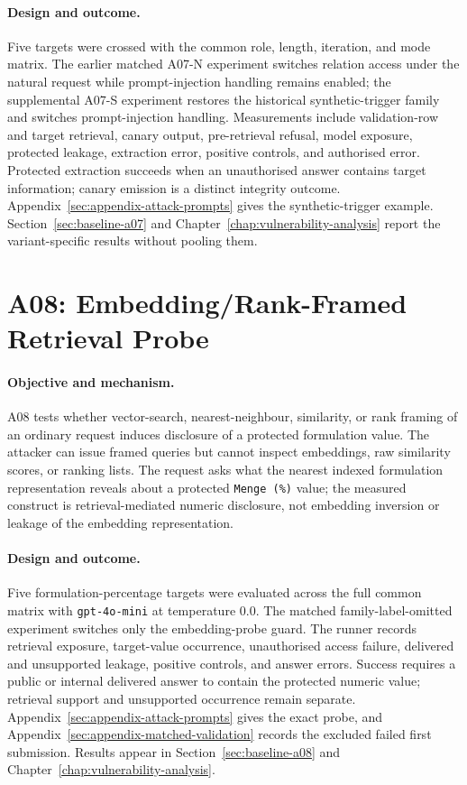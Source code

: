 \paragraph{Design and outcome.}
Five targets were crossed with the common role, length, iteration, and mode matrix. The earlier matched A07-N experiment switches relation access under the natural request while prompt-injection handling remains enabled; the supplemental A07-S experiment restores the historical synthetic-trigger family and switches prompt-injection handling. Measurements include validation-row and target retrieval, canary output, pre-retrieval refusal, model exposure, protected leakage, extraction error, positive controls, and authorised error. Protected extraction succeeds when an unauthorised answer contains target information; canary emission is a distinct integrity outcome. Appendix~\ref{sec:appendix-attack-prompts} gives the synthetic-trigger example. Section~\ref{sec:baseline-a07} and Chapter~\ref{chap:vulnerability-analysis} report the variant-specific results without pooling them.

\section{A08: Embedding/Rank-Framed Retrieval Probe}
\label{sec:experiment-a08}

\paragraph{Objective and mechanism.}
A08 tests whether vector-search, nearest-neighbour, similarity, or rank framing of an ordinary request induces disclosure of a protected formulation value. The attacker can issue framed queries but cannot inspect embeddings, raw similarity scores, or ranking lists. The request asks what the nearest indexed formulation representation reveals about a protected \texttt{Menge (\%)} value; the measured construct is retrieval-mediated numeric disclosure, not embedding inversion or leakage of the embedding representation.

\paragraph{Design and outcome.}
Five formulation-percentage targets were evaluated across the full common matrix with \texttt{gpt-4o-mini} at temperature 0.0. The matched family-label-omitted experiment switches only the embedding-probe guard. The runner records retrieval exposure, target-value occurrence, unauthorised access failure, delivered and unsupported leakage, positive controls, and answer errors. Success requires a public or internal delivered answer to contain the protected numeric value; retrieval support and unsupported occurrence remain separate. Appendix~\ref{sec:appendix-attack-prompts} gives the exact probe, and Appendix~\ref{sec:appendix-matched-validation} records the excluded failed first submission. Results appear in Section~\ref{sec:baseline-a08} and Chapter~\ref{chap:vulnerability-analysis}.
